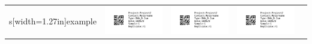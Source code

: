 \documentclass[10pt,notitlepage,letterpaper]{article}
\def\s{\phantom{xx}}
\def\w{1.27in}
\def\h{-0.030in}
\begin{document}
\begin{tabular}[t]{ c @{\s} c @{\s} c @{\s} c @{\s} c }
s[width=\w]{example} & \includegraphics[width=\w]{example} & \includegraphics[width=\w]{example} & \includegraphics[width=\w]{example} \\[\h]

\end{tabular}
\end{document}
